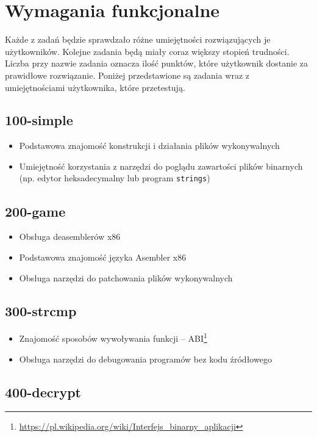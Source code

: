 \documentclass[language=polish,type=eng]{aghmodern}
\begin{document}
\section{Wymagania funkcjonalne}

Każde z zadań będzie sprawdzało różne umiejętności rozwiązujących je użytkowników.
Kolejne zadania będą miały coraz większy stopień trudności. Liczba przy nazwie zadania
oznacza ilość punktów, które użytkownik dostanie za prawidłowe rozwiązanie.
Poniżej przedstawione są zadania wraz z umiejętnościami użytkownika,
które przetestują.

\subsection{100-simple}
\begin{itemize}
    \item Podstawowa znajomość konstrukcji i działania plików wykonywalnych
    \item Umiejętność korzystania z narzędzi do poglądu zawartości plików binarnych
    (np. edytor heksadecymalny lub program \texttt{strings})
\end{itemize}

\subsection{200-game}

\begin{itemize}
    \item Obsługa deasemblerów x86
    \item Podstawowa znajomość języka Asembler x86
    \item Obsługa narzędzi do patchowania plików wykonywalnych
\end{itemize}

\subsection{300-strcmp}

\begin{itemize}
    \item Znajomość sposobów wywoływania funkcji -- ABI\footnote{
    \url{https://pl.wikipedia.org/wiki/Interfejs_binarny_aplikacji}}
    \item Obsługa narzędzi do debugowania programów bez kodu źródłowego
\end{itemize}

\subsection{400-decrypt}
\end{document}
